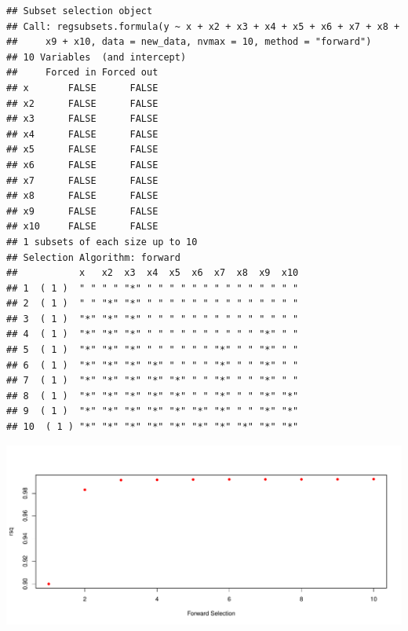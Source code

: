 \documentclass[]{article}
\newenvironment{Shaded}{\begin{snugshade}}{\end{snugshade}}
\newcommand{\KeywordTok}[1]{\textcolor[rgb]{0.13,0.29,0.53}{\textbf{#1}}}
\newcommand{\DataTypeTok}[1]{\textcolor[rgb]{0.13,0.29,0.53}{#1}}
\newcommand{\DecValTok}[1]{\textcolor[rgb]{0.00,0.00,0.81}{#1}}
\newcommand{\StringTok}[1]{\textcolor[rgb]{0.31,0.60,0.02}{#1}}
\newcommand{\OperatorTok}[1]{\textcolor[rgb]{0.81,0.36,0.00}{\textbf{#1}}}
\newcommand{\NormalTok}[1]{#1}
\begin{document}
\begin{verbatim}
## Subset selection object
## Call: regsubsets.formula(y ~ x + x2 + x3 + x4 + x5 + x6 + x7 + x8 + 
##     x9 + x10, data = new_data, nvmax = 10, method = "forward")
## 10 Variables  (and intercept)
##     Forced in Forced out
## x       FALSE      FALSE
## x2      FALSE      FALSE
## x3      FALSE      FALSE
## x4      FALSE      FALSE
## x5      FALSE      FALSE
## x6      FALSE      FALSE
## x7      FALSE      FALSE
## x8      FALSE      FALSE
## x9      FALSE      FALSE
## x10     FALSE      FALSE
## 1 subsets of each size up to 10
## Selection Algorithm: forward
##           x   x2  x3  x4  x5  x6  x7  x8  x9  x10
## 1  ( 1 )  " " " " "*" " " " " " " " " " " " " " "
## 2  ( 1 )  " " "*" "*" " " " " " " " " " " " " " "
## 3  ( 1 )  "*" "*" "*" " " " " " " " " " " " " " "
## 4  ( 1 )  "*" "*" "*" " " " " " " " " " " "*" " "
## 5  ( 1 )  "*" "*" "*" " " " " " " "*" " " "*" " "
## 6  ( 1 )  "*" "*" "*" "*" " " " " "*" " " "*" " "
## 7  ( 1 )  "*" "*" "*" "*" "*" " " "*" " " "*" " "
## 8  ( 1 )  "*" "*" "*" "*" "*" " " "*" " " "*" "*"
## 9  ( 1 )  "*" "*" "*" "*" "*" "*" "*" " " "*" "*"
## 10  ( 1 ) "*" "*" "*" "*" "*" "*" "*" "*" "*" "*"
\end{verbatim}

\begin{Shaded}
\end{Shaded}

\includegraphics{hw2_fall18_files/figure-latex/unnamed-chunk-5-1.pdf}
\end{document}
